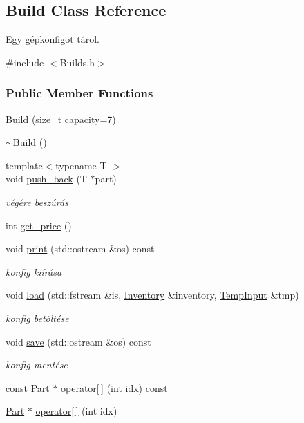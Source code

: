 \hypertarget{class_build}{}\subsection{Build Class Reference}
\label{class_build}


Egy gépkonfigot tárol.  




{\ttfamily \#include $<$Builds.\+h$>$}

\subsubsection*{Public Member Functions}
\begin{DoxyCompactItemize}
\item 
\mbox{\hyperlink{class_build_ab9b72c3479d483c0b452af30bb544de8}{Build}} (size\+\_\+t capacity=7)
\item 
\mbox{\hyperlink{class_build_a8f1d400e9bc158b6339cc1785b18d07b}{$\sim$\+Build}} ()
\item 
{\footnotesize template$<$typename T $>$ }\\void \mbox{\hyperlink{class_build_aba0548391a8c613ed2a9d81d4d3b2a4b}{push\+\_\+back}} (T $\ast$part)
\begin{DoxyCompactList}\small\item\em végére beszúrás \end{DoxyCompactList}\item 
int \mbox{\hyperlink{class_build_aded745a17c7d6b569244cb377ff62a9c}{get\+\_\+price}} ()
\item 
void \mbox{\hyperlink{class_build_adb328444dd8bf97b36356be36db01194}{print}} (std\+::ostream \&os) const
\begin{DoxyCompactList}\small\item\em konfig kiírása \end{DoxyCompactList}\item 
void \mbox{\hyperlink{class_build_a754a988f73da756210b083814986f2f1}{load}} (std\+::fstream \&is, \mbox{\hyperlink{class_inventory}{Inventory}} \&inventory, \mbox{\hyperlink{struct_temp_input}{Temp\+Input}} \&tmp)
\begin{DoxyCompactList}\small\item\em konfig betöltése \end{DoxyCompactList}\item 
void \mbox{\hyperlink{class_build_a954cd881cec1bf789fb57d7cdf617367}{save}} (std\+::ostream \&os) const
\begin{DoxyCompactList}\small\item\em konfig mentése \end{DoxyCompactList}\item 
const \mbox{\hyperlink{class_part}{Part}} $\ast$ \mbox{\hyperlink{class_build_af3e03ed173016d7ff348d1e7057bd97c}{operator\mbox{[}$\,$\mbox{]}}} (int idx) const
\item 
\mbox{\hyperlink{class_part}{Part}} $\ast$ \mbox{\hyperlink{class_build_aa48e871d88c60272ab5f6cd5b97aaad0}{operator\mbox{[}$\,$\mbox{]}}} (int idx)
\end{DoxyCompactItemize}


